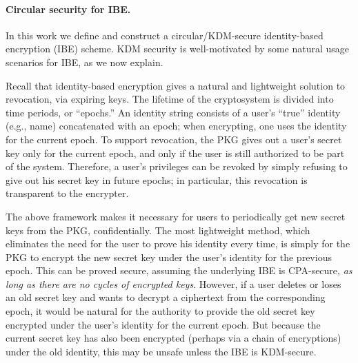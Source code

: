 \paragraph{Circular security for IBE.}

In this work we define and construct a circular/KDM-secure
identity-based encryption (IBE) scheme.  KDM security is
well-motivated by some natural usage scenarios for IBE, as we now
explain.

Recall that identity-based encryption gives a natural and lightweight
solution to revocation, via expiring keys.  The lifetime of the
cryptosystem is divided into time periods, or ``epochs.''  An identity
string consists of a user's ``true'' identity (e.g., name)
concatenated with an epoch; when encrypting, one uses the identity for
the current epoch.  To support revocation, the PKG gives out a user's
secret key only for the current epoch, and only if the user is still
authorized to be part of the system.  Therefore, a user's privileges
can be revoked by simply refusing to give out his secret key in future
epochs; in particular, this revocation is transparent to the
encrypter.

The above framework makes it necessary for users to periodically get
new secret keys from the PKG, confidentially.  The most lightweight
method, which eliminates the need for the user to prove his identity
every time, is simply for the PKG to encrypt the new secret key under
the user's identity for the previous epoch.  This can be proved
secure, assuming the underlying IBE is CPA-secure, \emph{as long as
  there are no cycles of encrypted keys}.  However, if a user deletes
or loses an old secret key and wants to decrypt a ciphertext from the
corresponding epoch, it would be natural for the authority to provide
the old secret key encrypted under the user's identity for the current
epoch.  But because the current secret key has also been encrypted
(perhaps via a chain of encryptions) under the old identity, this may
be unsafe unless the IBE is KDM-secure.


